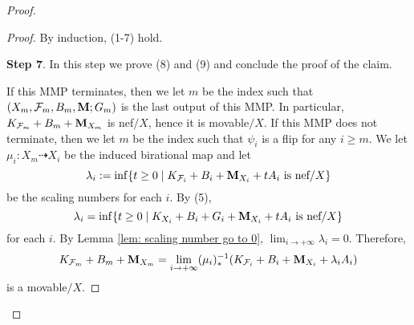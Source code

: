 \documentclass[11pt]{amsart}
\numberwithin{equation}{section}
\newcommand{\Mm}{{\bf{M}}}
\newcommand{\Ff}{\mathcal{F}}
\theoremstyle{definition}
\theoremstyle{definition}
\theoremstyle{definition}
\begin{document}
\begin{proof}
\begin{proof}
By induction, (1-7) hold.

\medskip

\noindent\textbf{Step 7}. In this step we prove (8) and (9) and conclude the proof of the claim.

If this MMP terminates, then we let $m$ be the index such that $(X_m,\Ff_m,B_m,\Mm;G_m)$ is the last output of this MMP. In particular, $K_{\Ff_m}+B_m+\Mm_{X_m}$ is nef$/X$, hence it is movable$/X$. If this MMP does not terminate, then we let $m$ be the index such that $\psi_i$ is a flip for any $i\geq m$. We let $\mu_i: X_m\dashrightarrow X_i$ be the induced birational map and let 
$$\lambda_i:=\inf\{t\geq 0\mid K_{\Ff_i}+B_i+\Mm_{X_i}+tA_i\text{ is nef}/X\}$$
be the scaling numbers for each $i$. By (5),
$$\lambda_i=\inf\{t\geq 0\mid K_{X_i}+B_i+G_i+\Mm_{X_i}+tA_i\text{ is nef}/X\}$$
for each $i$. By Lemma \ref{lem: scaling number go to 0}, $\lim_{i\rightarrow+\infty}\lambda_i=0$. Therefore,
$$K_{\Ff_m}+B_m+\Mm_{X_m}=\lim_{i\rightarrow+\infty}(\mu_i)^{-1}_*(K_{\Ff_i}+B_i+\Mm_{X_i}+\lambda_iA_i)$$
is a movable$/X$.


\end{proof}
\end{proof}
\end{document}
